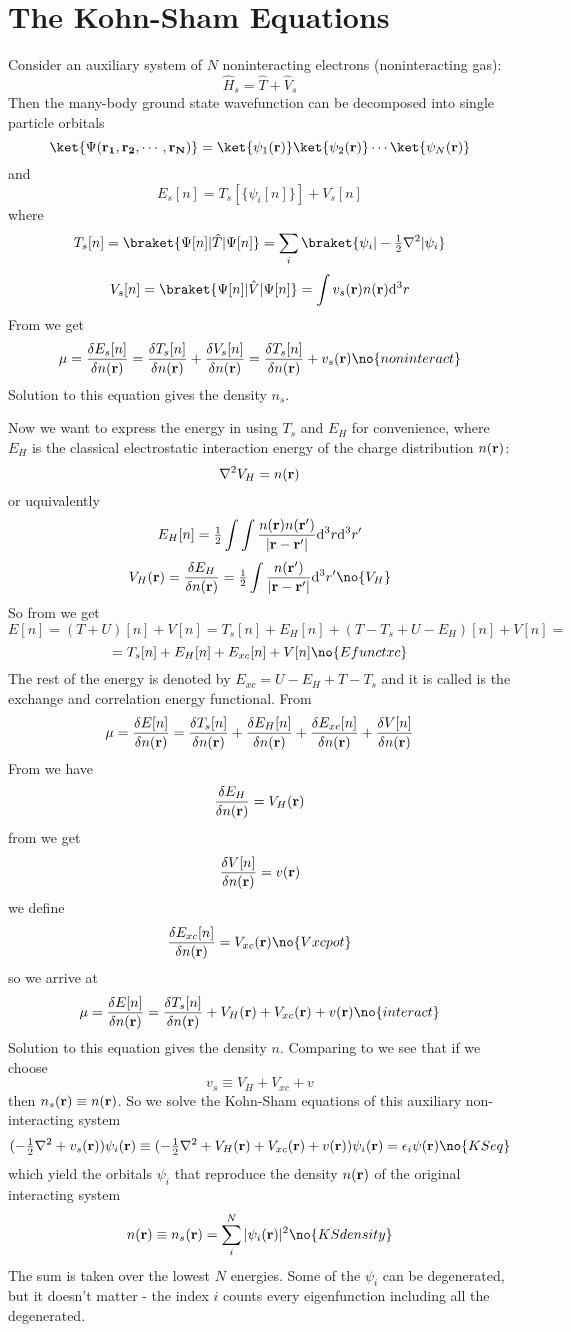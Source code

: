 \section{The Kohn-Sham Equations}

Consider an auxiliary system of $N$ noninteracting electrons (noninteracting
gas):
$$\hat H_s=\hat T+\hat V_s$$
Then the many-body ground state wavefunction can be decomposed into single particle orbitals
$$\ket{\Psi ({\bf r_1},{\bf r_2},\cdots,{\bf r_N})}=
\ket{\psi_1({\bf r})}\ket{\psi_2({\bf r})}\cdots\ket{\psi_N({\bf r})}$$
and
$$E_s[n]=T_s[\{\psi_i[n]\}]+V_s[n]$$
where
$$T_s[n]=\braket{\Psi[n]|\hat T|\Psi[n]}=
\sum_i\braket{\psi_i|-\half\nabla^2|\psi_i}$$
$$V_s[n]=\braket{\Psi[n]|\hat V|\Psi[n]}=\int v_s({\bf r})n({\bf r})\d^3r$$
From  we get
$$\mu={\delta E_s[n]\over\delta n({\bf r})}=
{\delta T_s[n]\over\delta n({\bf r})}+{\delta V_s[n]\over\delta n({\bf r})}=
{\delta T_s[n]\over\delta n({\bf r})}+v_s({\bf r})\no{noninteract}
$$
Solution to this equation gives the density $n_s$.

Now we want to express the energy in  using $T_s$ and $E_H$ for
convenience, 
where $E_H$ is the classical electrostatic interaction energy of the charge
distribution $n({\bf r})$:
$$\nabla^2 V_H=n({\bf r})$$
or uquivalently
$$E_H[n]={\textstyle{1\over2}}\int\int {n({\bf r})n({\bf r'})\over|{\bf r}-{\bf r'}|}
{\rm d}^3r{\rm d}^3r'$$
$$V_H({\bf r})={\delta E_H\over\delta n({\bf r})}=\half\int 
{n({\bf r'})\over|{\bf r}-{\bf r'}|} \d^3r'\no{V_H}$$
So from  we get 
$$E[n]=(T+U)[n]+V[n]=T_s[n]+E_H[n]+(T-T_s+U-E_H)[n]+V[n]=$$
$$=T_s[n]+E_H[n]+E_{xc}[n]+V[n]\no{Efunctxc}$$
The rest of the energy is denoted by $E_{xc}=U-E_H+T-T_s$ and it is called is the
exchange and correlation energy functional.
From 
$$\mu={\delta E[n]\over\delta n({\bf r})}=
{\delta T_s[n]\over\delta n({\bf r})}+
{\delta E_H[n]\over\delta n({\bf r})}+
{\delta E_{xc}[n]\over\delta n({\bf r})}+
{\delta V[n]\over\delta n({\bf r})}
$$
From  we have
$${\delta E_H\over\delta n({\bf r})}=V_H({\bf r})$$
from  we get
$${\delta V[n]\over\delta n({\bf r})}=v({\bf r})$$
we define 
$${\delta E_{xc}[n]\over\delta n({\bf r})}=V_{xc}({\bf r})\no{Vxcpot}$$
so we arrive at
$$\mu={\delta E[n]\over\delta n({\bf r})}=
{\delta T_s[n]\over\delta n({\bf r})}+V_H({\bf r})+V_{xc}({\bf r})+v({\bf r})
\no{interact}
$$
Solution to this equation gives the density $n$.
Comparing  to  we see that if we choose
$$v_s\equiv V_H+V_{xc}+v$$
then $n_s({\bf r})\equiv n({\bf r})$.
So we solve the Kohn-Sham equations of this auxiliary non-interacting system
$$(-\half\nabla^2+v_s({\bf r}))\psi_i({\bf r})
\equiv(-\half\nabla^2+V_H({\bf r})+V_{xc}({\bf r})+v({\bf r}))\psi_i({\bf r})
=\epsilon_i\psi({\bf r})\no{KSeq}$$
which yield the orbitals $\psi_i$ that reproduce the density $n({\bf r})$ of
the original interacting system
$$n({\bf r})\equiv n_s({\bf r})=\sum_i^N|\psi_i({\bf r})|^2\no{KSdensity}$$
The sum is taken over the lowest $N$ energies. Some of the $\psi_i$ can be
degenerated, but it doesn't matter - the index $i$ counts every eigenfunction
including all the degenerated.

